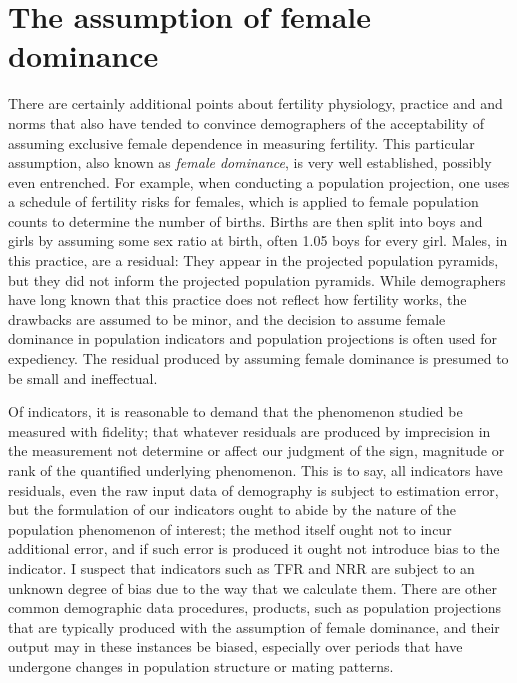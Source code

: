 \documentclass[reqno,12pt,oneside,a4paper]{report} %
\theoremstyle{plain}
\theoremstyle{definition}
\theoremstyle{remark}
\numberwithin{theorem}{chapter}     %
\begin{document}
\section{The assumption of female dominance}

There are certainly additional points about fertility physiology, practice and and norms that also have tended to convince demographers of the acceptability of assuming exclusive female dependence in measuring fertility. This particular assumption, also known as \textit{female dominance}, is very well established, possibly even entrenched. For example, when conducting a population projection, one uses a schedule of fertility risks for females, which is applied to female population counts to determine the number of births. Births are then split into boys and girls by assuming some sex ratio at birth, often 1.05 boys for every girl. Males, in this practice, are a residual: They appear in the projected population pyramids, but they did not inform the projected population pyramids. While demographers have long known that this practice does not reflect how fertility works, the drawbacks are assumed to be minor, and the decision to assume female dominance in population indicators and population projections is often used for expediency. The residual produced by assuming female dominance is presumed to be small and ineffectual.

Of indicators, it is reasonable to demand that the phenomenon studied be measured with fidelity; that whatever residuals are produced by imprecision in the measurement not determine or affect our judgment of the sign, magnitude or rank of the quantified underlying phenomenon. This is to say, all indicators have residuals, even the raw input data of demography is subject to estimation error, but the formulation of our indicators ought to abide by the nature of the population phenomenon of interest; the method itself ought not to incur additional error, and if such error is produced it ought not introduce bias to the indicator. I suspect that indicators such as TFR and NRR are subject to an unknown degree of bias due to the way that we calculate them. There are other common demographic data procedures, products, such as population projections that are typically produced with the assumption of female dominance, and their output may in these instances be biased, especially over periods that have undergone changes in population structure or mating patterns.
\end{document}
